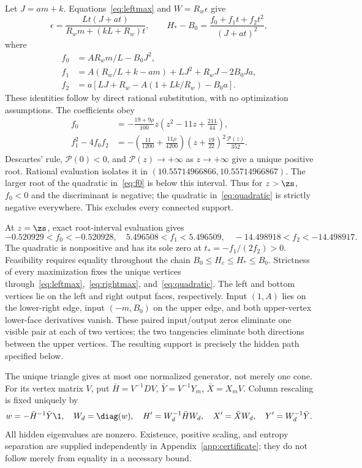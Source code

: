 Let $J=am+k$. Equations~\eqref{eq:leftmax} and $W=R_w\epsilon$ give
\begin{equation}
 \epsilon=\frac{Lt(J+at)}{R_wm+(kL+R_w)t},\qquad
 H_*-B_0=\frac{f_0+f_1t+f_2t^2}{(J+at)^2},\label{eq:quadratic}
\end{equation}
where
\begin{align}
 f_0&=AR_wm/L-B_0J^2,\\
 f_1&=A(R_w/L+k-am)+LJ^2+R_wJ-2B_0Ja,\\
 f_2&=a[LJ+R_w-A(1+Lk/R_w)-B_0a].\label{eq:fcoeff}
\end{align}
These identities follow by direct rational substitution, with no optimization assumptions. The coefficients obey
\begin{align}
 f_0&=-\frac{19+9\rho}{100}z\left(z^2-11z+\frac{211}{44}\right),\label{eq:f0}\\
 f_1^2-4f_0f_2
 &=-\left(\frac{11}{1200}+\frac{11\rho}{4200}\right)
 \left(z+\frac{19}{22}\right)^2\frac{\mathcal P(z)}{352}.\label{eq:discriminant}
\end{align}
Descartes' rule, $\mathcal P(0)<0$, and $\mathcal P(z)\to+\infty$ as $z\to+\infty$ give a unique positive root. Rational evaluation isolates it in $(10.55714966866,10.55714966867)$. The larger root of the quadratic in~\eqref{eq:f0} is below this interval. Thus for $z>\zs$, $f_0<0$ and the discriminant is negative; the quadratic in~\eqref{eq:quadratic} is strictly negative everywhere. This excludes every connected support.

At $z=\zs$, exact root-interval evaluation gives
\begin{equation}
 -0.520929<f_0<-0.520928,\quad
 5.496508<f_1<5.496509,\quad
 -14.498918<f_2<-14.498917.
\end{equation}
The quadratic is nonpositive and has its sole zero at $t_*=-f_1/(2f_2)>0$. Feasibility requires equality throughout the chain $B_0\le H_c\le H_*\le B_0$. Strictness of every maximization fixes the unique vertices through~\eqref{eq:leftmax},~\eqref{eq:rightmax}, and~\eqref{eq:quadratic}. The left and bottom vertices lie on the left and right output faces, respectively. Input $(1,A)$ lies on the lower-right edge, input $(-m,B_0)$ on the upper edge, and both upper-vertex lower-face derivatives vanish. These paired input/output zeros eliminate one visible pair at each of two vertices; the two tangencies eliminate both directions between the upper vertices. The resulting support is precisely the hidden path specified below.

The unique triangle gives at most one normalized generator, not merely one cone. For its vertex matrix $V$, put $\bar H=V^{-1}DV$, $\bar Y=V^{-1}Y_m$, $\bar X=X_mV$. Column rescaling is fixed uniquely by
\begin{equation}
 w=-\bar H^{-1}\bar Y\1,\quad W_d=\diag(w),\quad
 H'=W_d^{-1}\bar HW_d,\quad X'=\bar XW_d,\quad Y'=W_d^{-1}\bar Y.\label{eq:normalize}
\end{equation}
All hidden eigenvalues are nonzero. Existence, positive scaling, and entropy separation are supplied independently in Appendix~\ref{app:certificate}; they do not follow merely from equality in a necessary bound.


